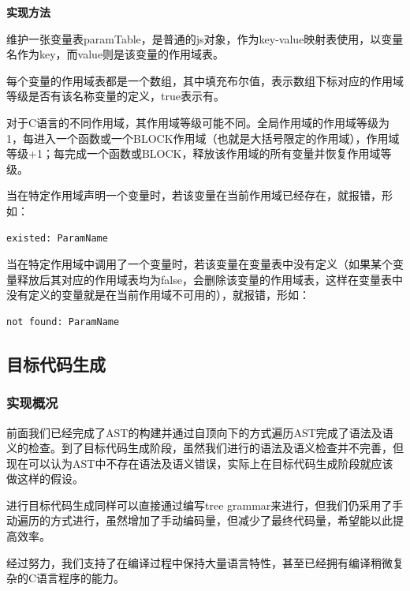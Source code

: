 \documentclass[a4paper]{article}
\begin{document}
\begin{CJK*}{UTF8}{gbsn}
    \par\noindent\textbf{实现方法}
    \par 维护一张变量表paramTable，是普通的js对象，作为key-value映射表使用，以变量名作为key，而value则是该变量的作用域表。
    \par 每个变量的作用域表都是一个数组，其中填充布尔值，表示数组下标对应的作用域等级是否有该名称变量的定义，true表示有。
    \par 对于C语言的不同作用域，其作用域等级可能不同。全局作用域的作用域等级为1，每进入一个函数或一个BLOCK作用域（也就是大括号限定的作用域），作用域等级+1；每完成一个函数或BLOCK，释放该作用域的所有变量并恢复作用域等级。
    \par 当在特定作用域声明一个变量时，若该变量在当前作用域已经存在，就报错，形如：
    \begin{verbatim}
existed: ParamName
    \end{verbatim}
    \par 当在特定作用域中调用了一个变量时，若该变量在变量表中没有定义（如果某个变量释放后其对应的作用域表均为false，会删除该变量的作用域表，这样在变量表中没有定义的变量就是在当前作用域不可用的），就报错，形如：
    \begin{verbatim}
not found: ParamName
    \end{verbatim}

    \subsection{目标代码生成}
    \subsubsection{实现概况}
    前面我们已经完成了AST的构建并通过自顶向下的方式遍历AST完成了语法及语义的检查。到了目标代码生成阶段，虽然我们进行的语法及语义检查并不完善，但现在可以认为AST中不存在语法及语义错误，实际上在目标代码生成阶段就应该做这样的假设。
    \par 进行目标代码生成同样可以直接通过编写tree grammar来进行，但我们仍采用了手动遍历的方式进行，虽然增加了手动编码量，但减少了最终代码量，希望能以此提高效率。
    \par 经过努力，我们支持了在编译过程中保持大量语言特性，甚至已经拥有编译稍微复杂的C语言程序的能力。


\end{CJK*}
\end{document}
